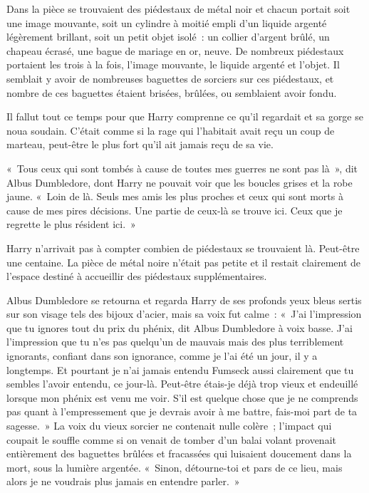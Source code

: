 Dans la pièce se trouvaient des piédestaux de métal noir et chacun portait soit une image mouvante, soit un cylindre à moitié empli d'un liquide argenté légèrement brillant, soit un petit objet isolé~: un collier d'argent brûlé, un chapeau écrasé, une bague de mariage en or, neuve. De nombreux piédestaux portaient les trois à la fois, l'image mouvante, le liquide argenté et l'objet. Il semblait y avoir de nombreuses baguettes de sorciers sur ces piédestaux, et nombre de ces baguettes étaient brisées, brûlées, ou semblaient avoir fondu.

Il fallut tout ce temps pour que Harry comprenne ce qu'il regardait et sa gorge se noua soudain. C'était comme si la rage qui l'habitait avait reçu un coup de marteau, peut-être le plus fort qu'il ait jamais reçu de sa vie.

«~Tous ceux qui sont tombés à cause de toutes mes guerres ne sont pas là~», dit Albus Dumbledore, dont Harry ne pouvait voir que les boucles grises et la robe jaune. «~Loin de là. Seuls mes amis les plus proches et ceux qui sont morts à cause de mes pires décisions. Une partie de ceux-là se trouve ici. Ceux que je regrette le plus résident ici.~»

Harry n'arrivait pas à compter combien de piédestaux se trouvaient là. Peut-être une centaine. La pièce de métal noire n'était pas petite et il restait clairement de l'espace destiné à accueillir des piédestaux supplémentaires.

Albus Dumbledore se retourna et regarda Harry de ses profonds yeux bleus sertis sur son visage tels des bijoux d'acier, mais sa voix fut calme~: «~J'ai l'impression que tu ignores tout du prix du phénix, dit Albus Dumbledore à voix basse. J'ai l'impression que tu n'es pas quelqu'un de mauvais mais des plus terriblement ignorants, confiant dans son ignorance, comme je l'ai été un jour, il y a longtemps. Et pourtant je n'ai jamais entendu Fumseck aussi clairement que tu sembles l'avoir entendu, ce jour-là. Peut-être étais-je déjà trop vieux et endeuillé lorsque mon phénix est venu me voir. S'il est quelque chose que je ne comprends pas quant à l'empressement que je devrais avoir à me battre, fais-moi part de ta sagesse.~» La voix du vieux sorcier ne contenait nulle colère~; l'impact qui coupait le souffle comme si on venait de tomber d'un balai volant provenait entièrement des baguettes brûlées et fracassées qui luisaient doucement dans la mort, sous la lumière argentée. «~Sinon, détourne-toi et pars de ce lieu, mais alors je ne voudrais plus jamais en entendre parler.~»

